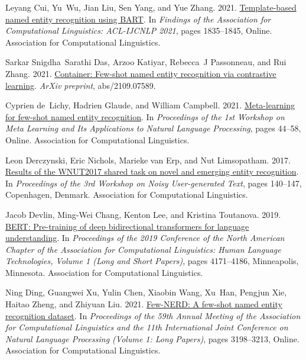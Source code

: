 \documentclass[11pt]{article}
\begin{document}
\begin{thebibliography}{45}
Leyang Cui, Yu~Wu, Jian Liu, Sen Yang, and Yue Zhang. 2021.
\newblock \href {https://doi.org/10.18653/v1/2021.findings-acl.161}
  {Template-based named entity recognition using {BART}}.
\newblock In \emph{Findings of the Association for Computational Linguistics:
  ACL-IJCNLP 2021}, pages 1835--1845, Online. Association for Computational
  Linguistics.

Sarkar Snigdha~Sarathi Das, Arzoo Katiyar, Rebecca~J Passonneau, and Rui Zhang.
  2021.
\newblock \href {https://arxiv.org/abs/2109.07589} {Container: Few-shot named
  entity recognition via contrastive learning}.
\newblock \emph{ArXiv preprint}, abs/2109.07589.

Cyprien de~Lichy, Hadrien Glaude, and William Campbell. 2021.
\newblock \href {https://doi.org/10.18653/v1/2021.metanlp-1.6} {Meta-learning
  for few-shot named entity recognition}.
\newblock In \emph{Proceedings of the 1st Workshop on Meta Learning and Its
  Applications to Natural Language Processing}, pages 44--58, Online.
  Association for Computational Linguistics.

Leon Derczynski, Eric Nichols, Marieke van Erp, and Nut Limsopatham. 2017.
\newblock \href {https://doi.org/10.18653/v1/W17-4418} {Results of the
  {WNUT}2017 shared task on novel and emerging entity recognition}.
\newblock In \emph{Proceedings of the 3rd Workshop on Noisy User-generated
  Text}, pages 140--147, Copenhagen, Denmark. Association for Computational
  Linguistics.

Jacob Devlin, Ming-Wei Chang, Kenton Lee, and Kristina Toutanova. 2019.
\newblock \href {https://doi.org/10.18653/v1/N19-1423} {{BERT}: Pre-training of
  deep bidirectional transformers for language understanding}.
\newblock In \emph{Proceedings of the 2019 Conference of the North {A}merican
  Chapter of the Association for Computational Linguistics: Human Language
  Technologies, Volume 1 (Long and Short Papers)}, pages 4171--4186,
  Minneapolis, Minnesota. Association for Computational Linguistics.

Ning Ding, Guangwei Xu, Yulin Chen, Xiaobin Wang, Xu~Han, Pengjun Xie, Haitao
  Zheng, and Zhiyuan Liu. 2021.
\newblock \href {https://doi.org/10.18653/v1/2021.acl-long.248} {Few-{NERD}: A
  few-shot named entity recognition dataset}.
\newblock In \emph{Proceedings of the 59th Annual Meeting of the Association
  for Computational Linguistics and the 11th International Joint Conference on
  Natural Language Processing (Volume 1: Long Papers)}, pages 3198--3213,
  Online. Association for Computational Linguistics.


\end{thebibliography}
\end{document}
